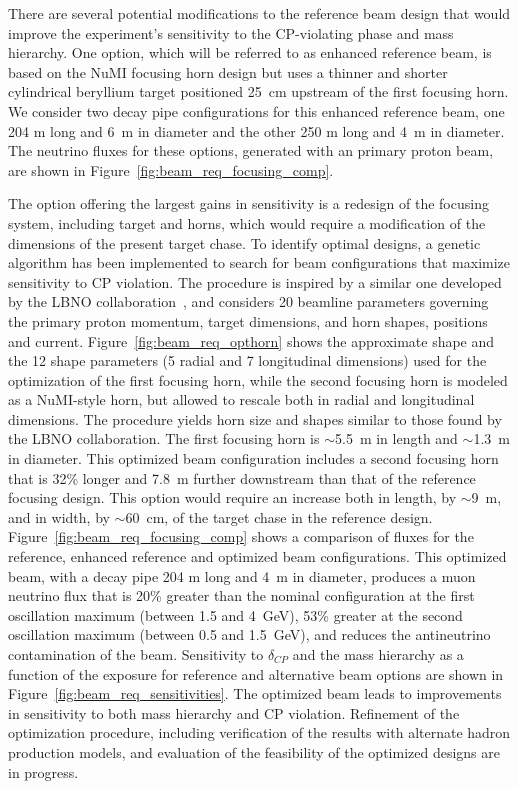 There are several potential modifications to the reference beam design
that would improve the experiment's sensitivity to the CP-violating
phase and mass hierarchy.  One option, which will be referred to as enhanced
reference beam, 
is based on the NuMI focusing horn design but uses a
thinner and shorter cylindrical beryllium target positioned 25~cm
upstream of the first focusing horn. We consider two decay pipe
configurations for this enhanced reference beam, one 204 m long and 6~m 
in diameter and the other 250 m long and 4~m in diameter.  The
neutrino fluxes for these options, generated with an  %
primary proton beam, are shown in Figure~\ref{fig:beam_req_focusing_comp}.
  
The option offering the largest gains in sensitivity is a redesign of
the focusing system, including target and horns, which would require a
modification of the dimensions of the present target chase.  To
identify optimal designs, a genetic algorithm has been implemented to
search for beam configurations that maximize sensitivity to CP
violation.  The procedure is inspired by a similar one developed by
the LBNO collaboration~\cite{Agarwalla:2014tca}, and considers 20
beamline parameters governing the primary proton momentum, target
dimensions, and horn shapes, positions and
current. Figure~\ref{fig:beam_req_opthorn} shows the approximate shape
and the 12 shape parameters (5 radial and 7 longitudinal dimensions) used for the
optimization of the first focusing horn, while the second focusing
horn is modeled as a NuMI-style horn, but allowed to rescale both in
radial and longitudinal dimensions. The procedure yields horn size and
shapes similar to those found by the LBNO collaboration. The first
focusing horn is $\sim$5.5~m in length and $\sim$1.3~m in
diameter. This optimized beam configuration includes a second focusing
horn that is 32\% longer and 7.8~m further downstream than that of the
reference focusing design.  This option would require an increase both
in length, by $\sim$9~m, and in width, by $\sim$60~cm, of the target
chase in the reference design.
Figure~\ref{fig:beam_req_focusing_comp} shows a comparison of fluxes
for the reference, enhanced reference and optimized beam
configurations. This optimized beam, with a decay pipe 204 m long and
4~m in diameter, produces a muon neutrino flux that is 20\% greater
than the nominal configuration at the first oscillation maximum
(between 1.5 and 4~GeV), 53\% greater at the second oscillation
maximum (between 0.5 and 1.5~GeV), and reduces the antineutrino
contamination of the beam.  Sensitivity to $\delta_{CP}$ and the mass
hierarchy as a function of the exposure for reference and alternative
beam options are shown in Figure~\ref{fig:beam_req_sensitivities}.
The optimized beam leads to improvements in sensitivity to both mass
hierarchy and CP violation. Refinement of the optimization procedure,
including verification of the results with alternate hadron production
models, and evaluation of the feasibility of the optimized designs are
in progress.

